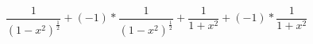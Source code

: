 \documentclass[a4paper]{article}
\begin{document}
\[
\frac{1}{\left(1-x^{2}\right)^{\frac{1}{2}}}+\left(-1\right)*\frac{1}{\left(1-x^{2}\right)^{\frac{1}{2}}}+\frac{1}{1+x^{2}}+\left(-1\right)*\frac{1}{1+x^{2}}
\]
\end{document}
